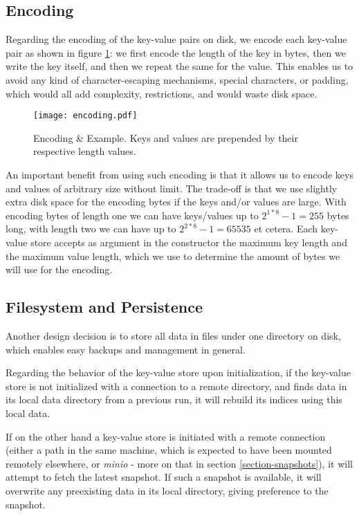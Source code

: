 \subsection{Encoding}

Regarding the encoding of the key-value pairs on disk, we encode each key-value pair as shown in figure \ref{fig:encoding}: we first encode the length of the key in bytes, then we write the key itself, and then we repeat the same for the value. This enables us to avoid any kind of character-escaping mechanisms, special characters, or padding, which would all add complexity, restrictions, and would waste disk space.

\vspace{20px}
\begin{figure}[h]
    \centering
    \texttt{[image: encoding.pdf]}
    \caption{Encoding \& Example. Keys and values are prepended by their respective length values.}
    \label{fig:encoding}
\end{figure}
\vspace{20px}

An important benefit from using such encoding is that it allows us to encode keys and values of arbitrary size without limit. The trade-off is that we use slightly extra disk space for the encoding bytes if the keys and/or values are large. With encoding bytes of length one we can have keys/values up to $2^{1*8}-1=255$ bytes long, with length two we can have up to $2^{2*8}-1=65535$ et cetera. Each key-value store accepts as argument in the constructor the maximum key length and the maximum value length, which we use to determine the amount of bytes we will use for the encoding.

\subsection{Filesystem and Persistence}

Another design decision is to store all data in files under one directory on disk, which enables easy backups and management in general.

Regarding the behavior of the key-value store upon initialization, if the key-value store is not initialized with a connection to a remote directory, and finds data in its local data directory from a previous run, it will rebuild its indices using this local data.

If on the other hand a key-value store is initiated with a remote connection (either a path in the same machine, which is expected to have been mounted remotely elsewhere, or \textit{minio} - more on that in section \ref{section-snapshots}), it will attempt to fetch the latest snapshot. If such a snapshot is available, it will overwrite any preexisting data in its local directory, giving preference to the snapshot.

